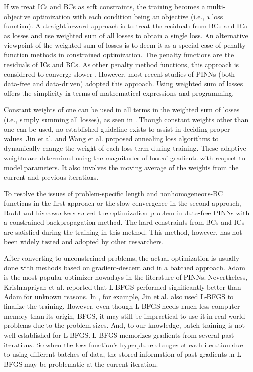 If we treat ICs and BCs as soft constraints, the training becomes a multi-objective optimization with each condition being an objective (i.e., a loss function).
A straightforward approach is to treat the residuals from BCs and ICs as losses and use weighted sum of all losses to obtain a single loss. 
An alternative viewpoint of the weighted sum of losses is to deem it as a special case of penalty function methods in constrained optimization.
The penalty functions are the residuals of ICs and BCs.
As other penalty method functions, this approach is considered to converge slower \cite{rudd_constrained_2014}.
However, most recent studies of PINNs (both data-free and data-driven) adopted this approach.
Using weighted sum of losses offers the simplicity in terms of mathematical expressions and programming.

Constant weights of one can be used in all terms in the weighted sum of losses (i.e., simply summing all losses), as seen in \cite{lagaris_artificial_1998,sirignano_dgm:_2018,dockhorn_discussion_2019}.
Though constant weights other than one can be used, no established guideline exists to assist in deciding proper values.
Jin et al. \cite{jin_nsfnets_2020} and Wang et al. \cite{wang_understanding_2021} proposed annealing loss algorithms to dynamically change the weight of each loss term during training.
These adaptive weights are determined using the magnitudes of losses' gradients with respect to model parameters.
It also involves the moving average of the weights from the current and previous iterations. 

To resolve the issues of problem-specific length and nonhomogeneous-BC functions in the first approach or the slow convergence in the second approach, Rudd and his coworkers \cite{rudd_constrained_2014,rudd_constrained_2015} solved the optimization problem in data-free PINNs with a constrained backpropagation method.
The hard constraints from BCs and ICs are satisfied during the training in this method.
This method, however, has not been widely tested and adopted by other researchers.

After converting to unconstrained problems, the actual optimization is usually done with methods based on gradient-descent and in a batched approach. 
Adam \cite{kingma_adam_2017} is the most popular optimizer nowadays in the literature of PINNs.
Nevertheless, Krishnapriyan et al. \cite{krishnapriyan_characterizing_2021} reported that L-BFGS performed significantly better than Adam for unknown reasons.
In \cite{jin_nsfnets_2020}, for example, Jin et al. also used L-BFGS to finalize the training.
However, even though L-BFGS needs much less computer memory than its origin, BFGS, it may still be impractical to use it in real-world problems due to the problem sizes.
And, to our knowledge, batch training is not well established for L-BFGS.
L-BFGS memorizes gradients from several past iterations.
So when the loss function's hyperplane changes at each iteration due to using different batches of data, the stored information of past gradients in L-BFGS may be problematic at the current iteration.

